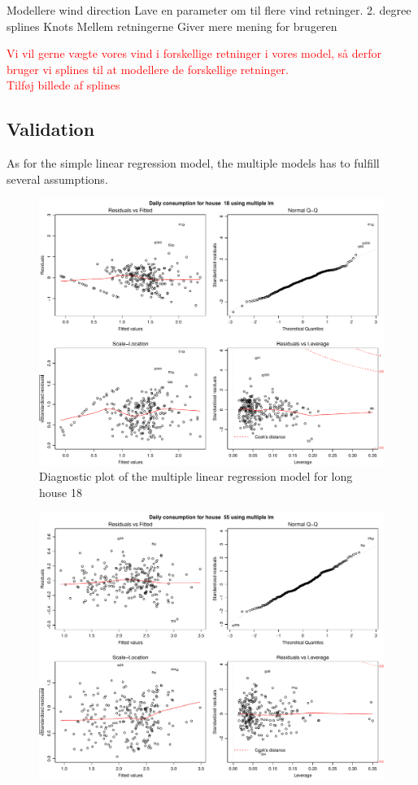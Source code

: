 Modellere wind direction
Lave en parameter om til flere vind retninger.
2. degree splines
Knots
Mellem retningerne
Giver mere mening for brugeren

\textcolor{red}{Vi vil gerne vægte vores vind i forskellige retninger i vores model, så derfor bruger vi splines til at modellere de forskellige retninger.} \\

\textcolor{red}{Tilføj billede af splines}

\subsection{Validation}
As for the simple linear regression model, the multiple models has to fulfill several assumptions. 

\begin{figure}
    \centering
    \includegraphics[width=1.\textwidth]{../../../figures/multiple_lm18L.pdf}
    \caption{Diagnostic plot of the multiple linear regression model for long house 18}
    \label{fig: multiple_lm18L}
\end{figure}
\begin{figure}
    \centering
    \includegraphics[width=1.\textwidth]{../../../figures/multiple_lm55L.pdf}
    \caption{}
    \label{fig: multiple_lm55L}
\end{figure}


